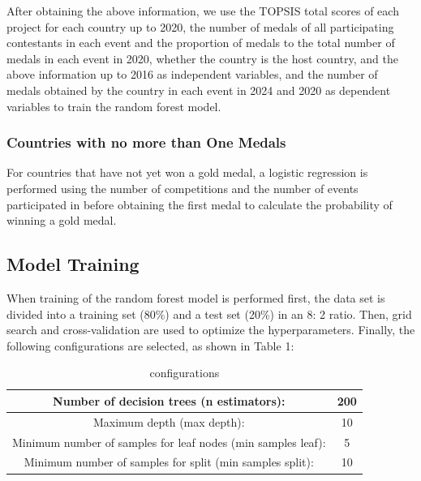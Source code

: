 \documentclass{mcmthesis}  %
\begin{document}
After obtaining the above information, we use the TOPSIS total scores of each project for each country up to 2020, the number of medals of all participating contestants in each event and the proportion of medals to the total number of medals in each event in 2020, whether the country is the host country, and the above information up to 2016 as independent variables, and the number of medals obtained by the country in each event in 2024 and 2020 as dependent variables to train the random forest model.

\subsubsection{Countries with no more than One Medals}  %
\hspace*{1.5em}For countries that have not yet won a gold medal, a logistic regression is performed using the number of competitions and the number of events participated in before obtaining the first medal to calculate the probability of winning a gold medal.

\subsection{Model Training}  %
\hspace*{1.5em}When training of the random forest model is performed first, the data set is divided into a training set (80\%) and a test set (20\%) in an 8: 2 ratio. Then, grid search and cross-validation are used to optimize the hyperparameters. Finally, the following configurations are selected, as shown in Table 1:
\begin{table}[H]  %
\caption{configurations}  %
\label{tab1}  %
\tabcolsep 15pt %
\begin{tabular*}{\textwidth}{cc}  %
\toprule  %
Number of decision trees (n estimators): & 200 \\
\midrule  %
Maximum depth (max depth): & 10 \\
\midrule  %
Minimum number of samples for leaf nodes (min samples leaf):&5\\
\midrule  %
 Minimum number of samples for split (min samples split):&10\\
\bottomrule  %
\end{tabular*}  %
\end{table}  %
\end{document}
